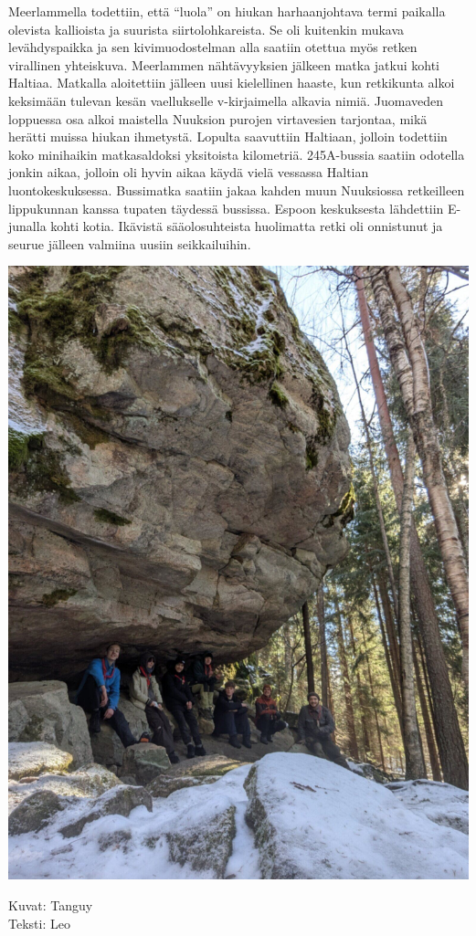 \begin{multicols}{2}
Meerlammella todettiin, että “luola” on hiukan harhaanjohtava termi paikalla
olevista kallioista ja suurista siirtolohkareista. Se oli kuitenkin mukava
levähdyspaikka ja sen kivimuodostelman alla saatiin otettua myös retken
virallinen yhteiskuva. Meerlammen nähtävyyksien jälkeen matka jatkui kohti
Haltiaa. Matkalla aloitettiin jälleen uusi kielellinen haaste, kun retkikunta
alkoi keksimään tulevan kesän vaellukselle v-kirjaimella alkavia nimiä.
Juomaveden loppuessa osa alkoi maistella Nuuksion purojen virtavesien
tarjontaa, mikä herätti muissa hiukan ihmetystä. Lopulta saavuttiin Haltiaan,
jolloin todettiin koko minihaikin matkasaldoksi yksitoista kilometriä.
245A-bussia saatiin odotella jonkin aikaa, jolloin oli hyvin aikaa käydä vielä
vessassa Haltian luontokeskuksessa. Bussimatka saatiin jakaa kahden muun
Nuuksiossa retkeilleen lippukunnan kanssa tupaten täydessä bussissa. Espoon
keskuksesta lähdettiin E-junalla kohti kotia. Ikävistä sääolosuhteista
huolimatta retki oli onnistunut ja seurue jälleen valmiina uusiin
seikkailuihin.
\columnbreak

\noindent\includegraphics[width=1.2\linewidth,trim={4cm 0 6cm 0},clip]{assets/minihaikki7}

\end{multicols}


\noindent\null\hfill Kuvat: Tanguy\\
\noindent\null\hfill Teksti: Leo
